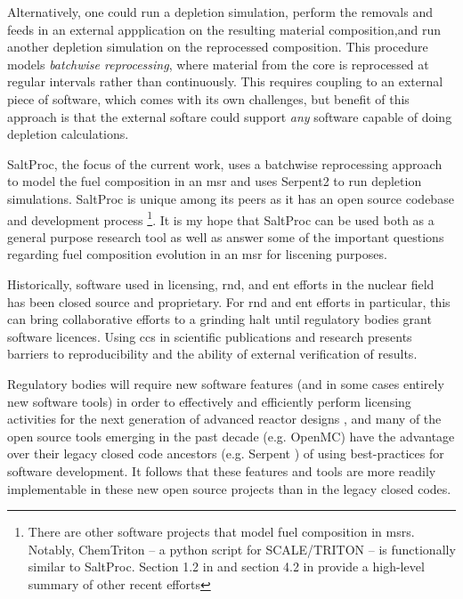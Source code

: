 Alternatively, one could run a depletion simulation, perform the removals and feeds in an external appplication on the resulting material composition,and run another depletion simulation on the reprocessed composition. This procedure models {\it batchwise reprocessing}, where material from the core is reprocessed at regular intervals rather than continuously. This requires coupling to an external piece of software, which comes with its own challenges, but benefit of this approach is that the external softare could
support {\it any} software capable of doing depletion calculations.

SaltProc\cite{rykhlevskii_saltproc_2018}, the focus of the current work, uses a batchwise reprocessing approach to model the fuel composition in an \Gls{msr} and uses Serpent2\cite{leppanen_serpent_2014} to run depletion simulations. SaltProc is unique among its peers as it has an open source codebase and development process \footnote{There are other software projects that model fuel composition in \Gls{msr}s. Notably, ChemTriton\cite{betzler_molten_2017} -- a python script for SCALE/TRITON -- is
functionally similar to SaltProc. Section 1.2 in \cite{rykhlevskii_fuel_2020} and section 4.2 in \cite{rykhlevskii_advanced_2018} provide a high-level summary of other recent efforts}. It is my hope that SaltProc can be used both as a general purpose research tool as well as answer some of the important questions regarding fuel composition evolution in an \Gls{msr} for liscening purposes. 

Historically, software used in licensing, \Gls{rnd}, and \Gls{ent} efforts in the nuclear field has been closed source and proprietary. For \Gls{rnd} and \Gls{ent} efforts in particular, this can bring collaborative efforts to a grinding halt until regulatory bodies grant software licences. Using \Gls{cc}s in scientific publications and research presents barriers to reproducibility and the ability of external verification of results.
    
    Regulatory bodies will require new software features (and in some cases entirely new software tools) in order to effectively and efficiently perform licensing activities for the next generation of advanced reactor designs \cite{usnrc_nonlwr_2020-1}, and many of the open source tools emerging in the past decade (e.g. OpenMC\cite{romano_openmc_2015}) have the advantage over their legacy closed code ancestors (e.g. Serpent \cite{leppanen_serpent_2014}) of using best-practices for software development. It follows that these features and tools are more readily implementable in these new open source projects than in the legacy closed codes.
    
